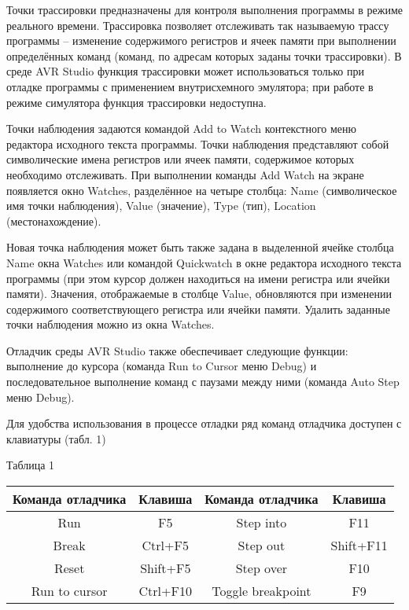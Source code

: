 \documentclass[14pt,a4paper]{extreport}
\begin{document}
	\clearpage
	
	Точки трассировки предназначены для контроля выполнения программы в режиме реального времени. Трассировка позволяет отслеживать так называемую трассу программы – изменение содержимого регистров и ячеек памяти при выполнении определённых команд (команд, по адресам которых заданы точки трассировки). В среде AVR Studio функция трассировки может использоваться только при отладке программы с применением внутрисхемного эмулятора; при работе в режиме симулятора функция трассировки недоступна.
	
	Точки наблюдения задаются командой Add to Watch контекстного меню редактора исходного текста программы. Точки наблюдения представляют собой символические имена регистров или ячеек памяти, содержимое которых необходимо отслеживать. При выполнении команды Add Watch на экране появляется окно Watches, разделённое на четыре столбца: Name (символическое имя точки наблюдения), Value (значение), Type (тип), Location (местонахождение). 
	
	Новая точка наблюдения может быть также задана в выделенной ячейке столбца Name окна Watches или командой Quickwatch в окне редактора исходного текста программы (при этом курсор должен находиться на имени регистра или ячейки памяти). Значения, отображаемые в столбце Value, обновляются при изменении содержимого соответствующего регистра или ячейки памяти. Удалить заданные точки наблюдения можно из окна Watches.
	
	Отладчик среды AVR Studio также обеспечивает следующие функции: выполнение до курсора (команда Run to Cursor меню Debug) и последовательное выполнение команд с паузами между ними (команда Auto Step меню Debug).
	
	Для удобства использования в процессе отладки ряд команд отладчика доступен с клавиатуры (табл. 1)
	
\vspace{10pt}
	
\begin{flushleft}
Таблица 1
\end{flushleft}

\begin{center}
\begin{tabular}{|c|c|c|c|}
\hline
Команда отладчика&Клавиша&Команда отладчика & Клавиша\\
\hline
Run&F5&Step into&F11\\
\hline
Break&Ctrl+F5&Step out&Shift+F11\\
\hline
Reset&Shift+F5&Step over&F10\\
\hline
Run to cursor&Ctrl+F10&Toggle breakpoint&F9\\
\hline
\end{tabular}
\end{center}
\end{document}
